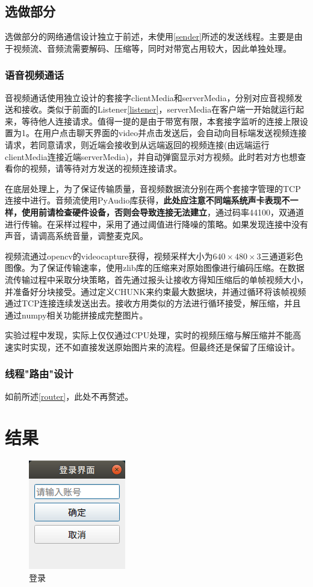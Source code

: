 \documentclass[UTF8]{ctexart}
\begin{document}
\subsection{选做部分}
选做部分的网络通信设计独立于前述，未使用\ref{sender}所述的发送线程。主要是由于视频流、音频流需要解码、压缩等，同时对带宽占用较大，因此单独处理。
\subsubsection{语音视频通话}
音视频通话使用独立设计的套接字clientMedia和serverMedia，分别对应音视频发送和接收。类似于前面的Listener\ref{listener}，serverMedia在客户端一开始就运行起来，等待他人连接请求。值得一提的是由于带宽有限，本套接字监听的连接上限设置为1。在用户点击聊天界面的video并点击发送后，会自动向目标端发送视频连接请求，若同意请求，则近端会接收到从远端返回的视频连接(由远端运行clientMedia连接近端serverMedia)，并自动弹窗显示对方视频。此时若对方也想查看你的视频，请等待对方发送的视频连接请求。

在底层处理上，为了保证传输质量，音视频数据流分别在两个套接字管理的TCP连接中进行。音频流使用PyAudio库获得，\textbf{此处应注意不同端系统声卡表现不一样，使用前请检查硬件设备，否则会导致连接无法建立}，通过码率44100，双通道进行传输。在采样过程中，采用了通过阈值进行降噪的策略。如果发现连接中没有声音，请调高系统音量，调整麦克风。

视频流通过opencv的videocapture获得，视频采样大小为$640\times480\times3$三通道彩色图像。为了保证传输速率，使用zlib库的压缩来对原始图像进行编码压缩。在数据流传输过程中采取分块策略，首先通过报头让接收方得知压缩后的单帧视频大小，并准备好分块接受。通过定义CHUNK来约束最大数据块，并通过循环将该帧视频通过TCP连接连续发送出去。接收方用类似的方法进行循环接受，解压缩，并且通过numpy相关功能拼接成完整图片。

实验过程中发现，实际上仅仅通过CPU处理，实时的视频压缩与解压缩并不能高速实时实现，还不如直接发送原始图片来的流程。但最终还是保留了压缩设计。
\subsubsection{线程"路由"设计}
如前所述\ref{router}，此处不再赘述。
\section{结果}
\begin{figure}[H]
    \centering
    \includegraphics[scale=0.4]{login.png}
    \caption{登录}
\end{figure}
\end{document}
